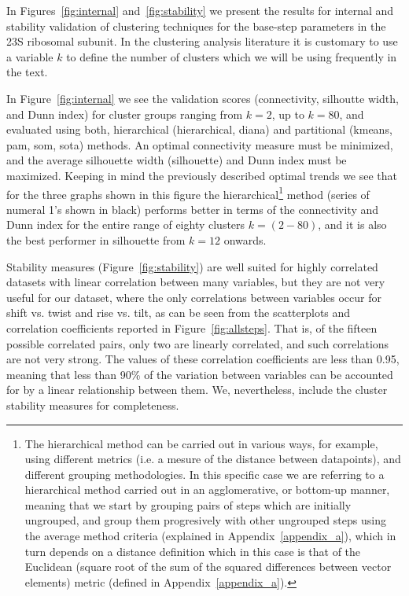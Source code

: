 In  Figures~\ref{fig:internal} and~\ref{fig:stability} we  present the
results for internal and stability validation of clustering techniques
for the  base-step parameters  in the 23S  ribosomal subunit.   In the
clustering analysis literature  it is customary to use  a variable $k$
to define the number of clusters  which we will be using frequently in
the text.

In   Figure~\ref{fig:internal}   we    see   the   validation   scores
(connectivity,  silhoutte width,  and Dunn  index) for  cluster groups
ranging  from   $k=2$,  up  to  $k=80$,  and   evaluated  using  both,
hierarchical (hierarchical, diana)  and partitional (kmeans, pam, som,
sota) methods. An optimal  connectivity measure must be minimized, and
the  average silhouette  width  (silhouette) and  Dunn  index must  be
maximized.  Keeping in mind the previously described optimal trends we
see   that  for   the  three   graphs   shown  in   this  figure   the
hierarchical\footnote{The  hierarchical method can  be carried  out in
various ways, for example, using  different metrics (i.e.  a mesure of
the   distance    between   datapoints),   and    different   grouping
methodologies.   In   this  specific  case  we  are   referring  to  a
hierarchical  method carried  out  in an  agglomerative, or  bottom-up
manner, meaning  that we  start by grouping  pairs of steps  which are
initially ungrouped, and group  them progresively with other ungrouped
steps    using   the   average    method   criteria    (explained   in
Appendix~\ref{appendix_a}),  which  in  turn  depends  on  a  distance
definition which in this case is that of the Euclidean (square root of
the  sum of the  squared differences  between vector  elements) metric
(defined  in Appendix~\ref{appendix_a}).}   method (series  of numeral
1's shown in  black) performs better in terms  of the connectivity and
Dunn index for the entire  range of eighty clusters $k=(2-80)$, and it
is also the best performer in silhouette from $k=12$ onwards.

Stability  measures (Figure~\ref{fig:stability})  are well  suited for
highly  correlated  datasets  with  linear  correlation  between  many
variables, but  they are  not very useful  for our dataset,  where the
only correlations between variables occur for shift vs. twist and rise
vs.   tilt, as  can  be  seen from  the  scatterplots and  correlation
coefficients reported  in Figure~\ref{fig:allsteps}.  That  is, of the
fifteen possible  correlated pairs, only two  are linearly correlated,
and  such  correlations are  not  very  strong.  The values  of  these
correlation coefficients  are less than  0.95, meaning that  less than
90\%  of the variation  between variables  can be  accounted for  by a
linear  relationship  between  them.   We, nevertheless,  include  the
cluster stability measures for completeness.

